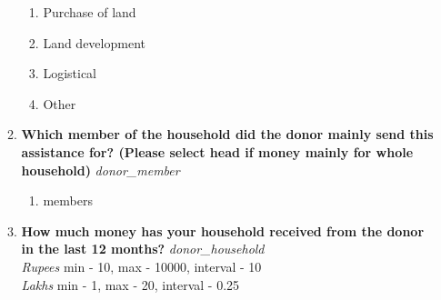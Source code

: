 \documentclass{article}
\begin{document}
\begin{enumerate}
\begin{enumerate}[label*=\arabic*.]
\begin{enumerate}
\item Purchase of land
\item Land development
\item Logistical
\item Other
\end{enumerate}
\item {\bfseries Which member of the household did the donor mainly send this assistance for? (Please select head if money mainly for whole household)}\emph{ donor\_member }
\begin{enumerate}
\item members
\end{enumerate}
\item {\bfseries How much money has your household received from the donor in the last 12 months? }\emph{ donor\_household }
\\ \emph{ Rupees }min - 10, max - 10000, interval - 10
\\ \emph{ Lakhs }min - 1, max - 20, interval - 0.25


\end{enumerate}
\end{enumerate}
\end{document}
